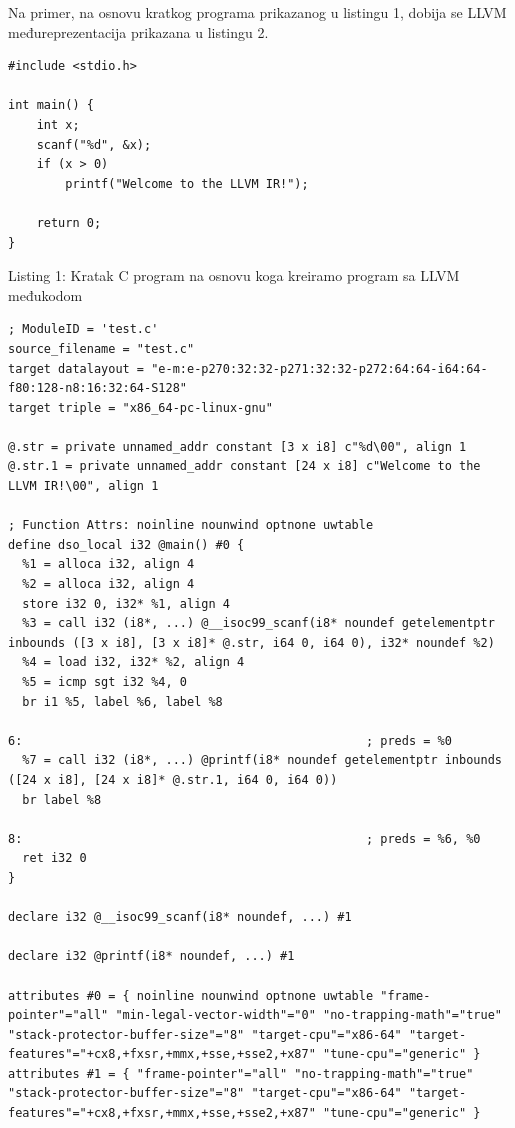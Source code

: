 \documentclass[12pt,oneside]{memoir}
\begin{document}
Na primer, na osnovu kratkog programa prikazanog u listingu 1, dobija se LLVM međureprezentacija prikazana u listingu 2.

\begin{listing}
\begin{verbatim}
#include <stdio.h>

int main() {
    int x;
    scanf("%d", &x);
    if (x > 0)
        printf("Welcome to the LLVM IR!");
    
    return 0;
}
\end{verbatim}
\caption{Listing 1: Kratak C program na osnovu koga kreiramo program sa LLVM međukodom}
\label{lst:llvm_compile_commands}
\end{listing}

\begin{listing}
\begin{verbatim}
; ModuleID = 'test.c'
source_filename = "test.c"
target datalayout = "e-m:e-p270:32:32-p271:32:32-p272:64:64-i64:64-f80:128-n8:16:32:64-S128"
target triple = "x86_64-pc-linux-gnu"

@.str = private unnamed_addr constant [3 x i8] c"%d\00", align 1
@.str.1 = private unnamed_addr constant [24 x i8] c"Welcome to the LLVM IR!\00", align 1

; Function Attrs: noinline nounwind optnone uwtable
define dso_local i32 @main() #0 {
  %1 = alloca i32, align 4
  %2 = alloca i32, align 4
  store i32 0, i32* %1, align 4
  %3 = call i32 (i8*, ...) @__isoc99_scanf(i8* noundef getelementptr inbounds ([3 x i8], [3 x i8]* @.str, i64 0, i64 0), i32* noundef %2)
  %4 = load i32, i32* %2, align 4
  %5 = icmp sgt i32 %4, 0
  br i1 %5, label %6, label %8

6:                                                ; preds = %0
  %7 = call i32 (i8*, ...) @printf(i8* noundef getelementptr inbounds ([24 x i8], [24 x i8]* @.str.1, i64 0, i64 0))
  br label %8

8:                                                ; preds = %6, %0
  ret i32 0
}

declare i32 @__isoc99_scanf(i8* noundef, ...) #1

declare i32 @printf(i8* noundef, ...) #1

attributes #0 = { noinline nounwind optnone uwtable "frame-pointer"="all" "min-legal-vector-width"="0" "no-trapping-math"="true" "stack-protector-buffer-size"="8" "target-cpu"="x86-64" "target-features"="+cx8,+fxsr,+mmx,+sse,+sse2,+x87" "tune-cpu"="generic" }
attributes #1 = { "frame-pointer"="all" "no-trapping-math"="true" "stack-protector-buffer-size"="8" "target-cpu"="x86-64" "target-features"="+cx8,+fxsr,+mmx,+sse,+sse2,+x87" "tune-cpu"="generic" }


\end{verbatim}
\end{listing}
\end{document}
